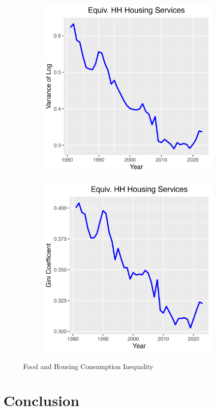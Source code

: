 \documentclass{article}
\begin{document}
\begin{figure}
\begin{subfigure}[t]{0.475\textwidth}
        \label{fig:Food_Gini}
    \end{subfigure}
    \begin{subfigure}[t]{0.475\textwidth}
        \centering
        \includegraphics[width=\textwidth]{Fig_8/Fig_8c_Var_Housing.png}
        \label{fig:Housing_Var}
    \end{subfigure}
    \begin{subfigure}[t]{0.475\textwidth}
        \centering
        \includegraphics[width=\textwidth]{Fig_8/Fig_8d_Gini_Housing.png}
        \label{fig:Housing_Gini}
    \end{subfigure}
    \caption{Food and Housing Consumption Inequality}
    \label{fig:Food_Housing}
\end{figure}


\section{Conclusion}
\end{document}
